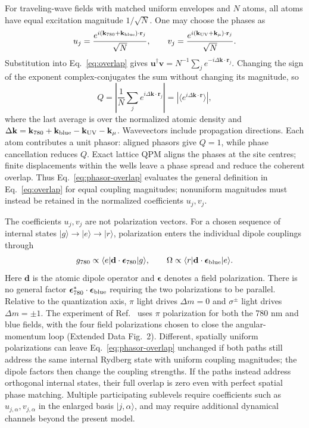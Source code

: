 \documentclass[aps,pra,onecolumn,10pt,letterpaper,notitlepage,nofootinbib,amsmath,amssymb]{revtex4-2}
\newcommand{\Om}{\Omega}
\begin{document}
For traveling-wave fields with matched uniform envelopes and $N$ atoms, all
atoms have equal excitation magnitude $1/\sqrt N$. One may choose the phases as
\[
 u_j=\frac{e^{i(\mathbf k_{780}+\mathbf k_{\rm blue})\cdot\mathbf r_j}}{\sqrt N},
 \qquad
 v_j=\frac{e^{i(\mathbf k_{\rm UV}+\mathbf k_\mu)\cdot\mathbf r_j}}{\sqrt N}.
\]
Substitution into Eq.~\eqref{eq:overlap} gives
$\mathbf u^\dagger\mathbf v=N^{-1}\sum_j e^{-i\Delta\mathbf k\cdot\mathbf r_j}$.
Changing the sign of the exponent complex-conjugates the sum without changing
its magnitude, so
\begin{equation}
 Q=\left|\frac{1}{N}\sum_j e^{i\Delta\mathbf k\cdot\mathbf r_j}\right|
  =|\langle e^{i\Delta\mathbf k\cdot\mathbf r}\rangle|,
 \label{eq:phasor-overlap}
\end{equation}
where the last average is over the normalized atomic density and
$\Delta\mathbf k=\mathbf k_{780}+\mathbf k_{\rm blue}-\mathbf k_{\rm UV}-\mathbf k_\mu$.
Wavevectors include propagation directions. Each atom contributes a unit
phasor: aligned phasors give $Q=1$, while phase cancellation reduces $Q$.
Exact lattice QPM aligns the phases at the site centres; finite displacements
within the wells leave a phase spread and reduce the coherent overlap.
Thus Eq.~\eqref{eq:phasor-overlap} evaluates the general definition in
Eq.~\eqref{eq:overlap} for equal coupling magnitudes; nonuniform magnitudes
must instead be retained in the normalized coefficients $u_j,v_j$.

The coefficients $u_j,v_j$ are not polarization vectors. For a chosen sequence
of internal states $|g\rangle\to|e\rangle\to|r\rangle$, polarization enters the
individual dipole couplings through
\[
 g_{780}\propto\langle e|\mathbf d\cdot\boldsymbol\epsilon_{780}|g\rangle,
 \qquad
 \Om\propto\langle r|\mathbf d\cdot\boldsymbol\epsilon_{\rm blue}|e\rangle.
\]
Here $\mathbf d$ is the atomic dipole operator and $\boldsymbol\epsilon$ denotes
a field polarization. There is no general factor
$\boldsymbol\epsilon_{780}^*\cdot\boldsymbol\epsilon_{\rm blue}$ requiring the
two polarizations to be parallel. Relative to the quantization axis, $\pi$
light drives $\Delta m=0$ and $\sigma^\pm$ light drives $\Delta m=\pm1$.
The experiment of Ref.~\cite{kumar} uses $\pi$ polarization for both the 780 nm
and blue fields, with the four field polarizations chosen to close the
angular-momentum loop (Extended Data Fig.~2).
Different, spatially uniform polarizations can leave
Eq.~\eqref{eq:phasor-overlap} unchanged if both paths still address the same
internal Rydberg state with uniform coupling magnitudes; the dipole factors
then change the coupling strengths. If the paths instead address orthogonal
internal states, their full overlap is zero even with perfect spatial phase
matching. Multiple participating sublevels require coefficients such as
$u_{j,\alpha},v_{j,\alpha}$ in the enlarged basis $|j,\alpha\rangle$, and may
require additional dynamical channels beyond the present model.
\end{document}
